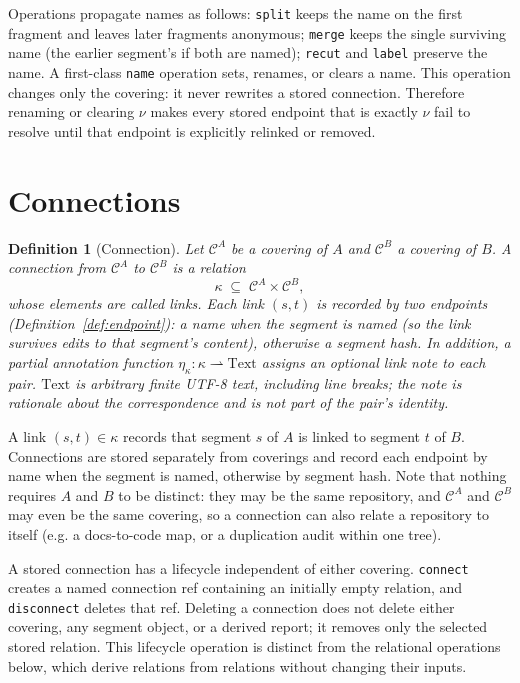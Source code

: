 \documentclass[11pt,a4paper]{article}
\newtheorem{definition}{Definition}[section]
\newcommand{\Cov}{\mathcal{C}}
\begin{document}
Operations propagate names as follows: \texttt{split} keeps the name on
the first fragment and leaves later fragments anonymous; \texttt{merge} keeps
the single surviving name (the earlier segment's if both are named);
\texttt{recut} and \texttt{label} preserve the name. A first-class
\texttt{name} operation sets, renames, or clears a name. This operation
changes only the covering: it never rewrites a stored connection. Therefore
renaming or clearing $\nu$ makes every stored endpoint that is exactly $\nu$
fail to resolve until that endpoint is explicitly relinked or removed.

\section{Connections}\label{sec:conn}

\begin{definition}[Connection]\label{def:connection}
Let $\Cov^A$ be a covering of $A$ and $\Cov^B$ a covering of $B$. A
\emph{connection} from $\Cov^A$ to $\Cov^B$ is a relation
\[
  \kappa \;\subseteq\; \Cov^A \times \Cov^B,
\]
whose elements are called \emph{links}. Each link $(s, t)$ is recorded
by two \emph{endpoints} (Definition~\ref{def:endpoint}): a name when the
segment is named (so the link survives edits to that segment's content),
otherwise a segment hash.
In addition, a partial annotation function
$\eta_\kappa : \kappa \rightharpoonup \mathrm{Text}$ assigns an optional
\emph{link note} to each pair. $\mathrm{Text}$ is arbitrary finite UTF-8
text, including line breaks; the note is rationale about the correspondence
and is not part of the pair's identity.
\end{definition}

A link $(s, t) \in \kappa$ records that segment $s$ of $A$ is linked
to segment $t$ of $B$. Connections are stored separately from
coverings and record each endpoint by name when the segment is named,
otherwise by segment hash. Note that nothing
requires $A$ and $B$ to be distinct: they may be the same repository, and
$\Cov^A$ and $\Cov^B$ may even be the same covering, so a connection can
also relate a repository to itself (e.g. a docs-to-code map, or a
duplication audit within one tree).

A stored connection has a lifecycle independent of either covering.
\texttt{connect} creates a named connection ref containing an initially empty
relation, and \texttt{disconnect} deletes that ref. Deleting a connection
does not delete either covering, any segment object, or a derived report; it
removes only the selected stored relation. This lifecycle operation is
distinct from the relational operations below, which derive relations from
relations without changing their inputs.
\end{document}
